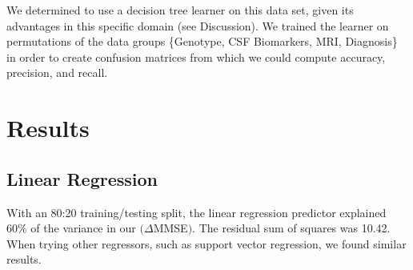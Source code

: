 \documentclass{article}
\begin{document}
We determined to use a decision tree learner on this data set, given its advantages in this specific domain (see Discussion). We trained the learner on permutations of the data groups \{Genotype, CSF Biomarkers, MRI, Diagnosis\} in order to create confusion matrices from which we could compute accuracy, precision, and recall. 

\section{Results}


\subsection{Linear Regression}
With an 80:20 training/testing split, the linear regression predictor explained 60\% of the variance in our $(\Delta$MMSE$)$. The residual sum of squares was 10.42. When trying other regressors, such as  support vector regression, we found similar results.

\end{document}
